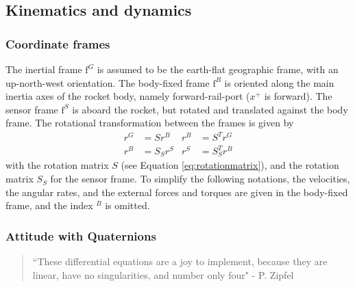 \subsection{Kinematics and dynamics}
\subsubsection{Coordinate frames}
The inertial frame $\mathrm{f}^G$ is assumed to be the earth-flat geographic frame, with an up-north-west orientation.
The body-fixed frame $\mathrm{f}^B$ is oriented along the main inertia axes of the rocket body, namely forward-rail-port ($x^+$ is forward).
The sensor frame $\mathrm{f}^S$ is aboard the rocket, but rotated and translated against the body frame.
The rotational transformation between the frames is given by
\begin{align}
    r^G &= S r^B & r^B &= S^T r^G \\
    r^B &= S_S r^S & r^S &= S_S^T r^B 
\end{align}
with the rotation matrix $S$ (see Equation \ref{eq:rotationmatrix}), and the rotation matrix $S_S$ for the sensor frame.
To simplify the following notations, the velocities, the angular rates, and the external forces and torques are given in the body-fixed frame, and the index $^B$ is omitted.  


\subsubsection{Attitude with Quaternions}
\begin{quote}
``These differential equations are a joy to implement, because they are linear, have no singularities, and number only four" - P. Zipfel \cite{zipfel2007}
\end{quote}

